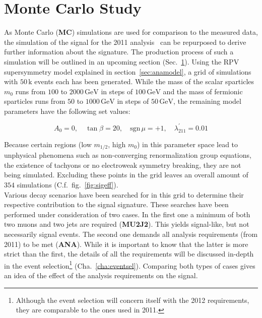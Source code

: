 \section{Monte Carlo Study}
\label{sec:mcstudy}

As Monte Carlo (\textbf{MC}) simulations are used for comparison to the measured data, the simulation of the signal for the 2011 analysis~\cite{endres} can be repurposed to derive further information about the signature. The production process of such a simulation will be outlined in an upcoming section (Sec.~\ref{sec:mcstudy}). Using the RPV supersymmetry model explained in section~\ref{sec:anamodel}, a grid of simulations with $50\,\text{k}$ events each has been generated. While the mass of the scalar sparticles $m_0$ runs from $100$ to $2000\,\text{GeV}$ in steps of $100\,\text{GeV}$ and the mass of fermionic sparticles runs from $50$ to $1000\,\text{GeV}$ in steps of $50\,\text{GeV}$, the remaining model parameters have the following set values:

\begin{equation*}
  A_0 = 0, \quad \tan{\beta} = 20, \quad \text{sgn}\,\mu = +1, \quad \lambda^\prime_{211} = 0.01
\end{equation*}

Because certain regions (low $m_{1/2}$, high $m_0$) in this parameter space lead to unphysical phenomena such as non-converging renormalization group equations, the existence of tachyons or no electroweak symmetry breaking, they are not being simulated. Excluding these points in the grid leaves an overall amount of $354$ simulations (C.f.~fig.~\ref{fig:sigeff}). \\

Various decay scenarios have been searched for in this grid to determine their respective contribution to the signal signature. These searches have been performed under consideration of two cases. In the first one a minimum of both two muons and two jets are required (\textbf{MU2J2}). This yields signal-like, but not necessarily signal events. The second one demands all analysis requirements (from 2011) to be met (\textbf{ANA}). While it is important to know that the latter is more strict than the first, the details of all the requirements will be discussed in-depth in the event selection\footnote{Although the event selection will concern itself with the 2012 requirements, they are comparable to the ones used in 2011.} (Cha.~\ref{cha:eventsel}). Comparing both types of cases gives an idea of the effect of the analysis requirements on the signal.

